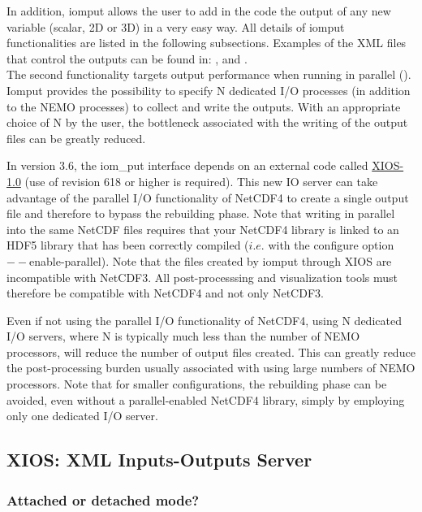 \documentclass[../tex_main/NEMO_manual]{subfiles}
\begin{document}
In addition, iomput allows the user to add in the code the output of any new variable (scalar, 2D or 
3D) in a very easy way.
All details of iomput functionalities are listed in the following subsections.
Examples of the XML files that control the outputs can be found in: 
,  and 
. \\

The second functionality targets output performance when running in parallel ().
Iomput provides the possibility to specify N dedicated I/O processes (in addition to 
the NEMO processes) to collect and write the outputs.
With an appropriate choice of N by the user, the bottleneck associated with the writing of 
the output files can be greatly reduced.

In version 3.6, the iom\_put interface depends on an external code called 
\href{https://forge.ipsl.jussieu.fr/ioserver/browser/XIOS/branchs/xios-1.0}{XIOS-1.0} 
(use of revision 618 or higher is required).
This new IO server can take advantage of the parallel I/O functionality of NetCDF4 to 
create a single output file and therefore to bypass the rebuilding phase.
Note that writing in parallel into the same NetCDF files requires that 
your NetCDF4 library is linked to an HDF5 library that has been correctly compiled ($i.e.$ with 
the configure option $--$enable-parallel).
Note that the files created by iomput through XIOS are incompatible with NetCDF3.
All post-processsing and visualization tools must therefore be compatible with 
NetCDF4 and not only NetCDF3.

Even if not using the parallel I/O functionality of NetCDF4, using N dedicated I/O servers, 
where N is typically much less than the number of NEMO processors, 
will reduce the number of output files created.
This can greatly reduce the post-processing burden usually associated with using 
large numbers of NEMO processors.
Note that for smaller configurations, the rebuilding phase can be avoided, even without 
a parallel-enabled NetCDF4 library, simply by employing only one dedicated I/O server.

\subsection{XIOS: XML Inputs-Outputs Server}

\subsubsection{Attached or detached mode?}
\end{document}
